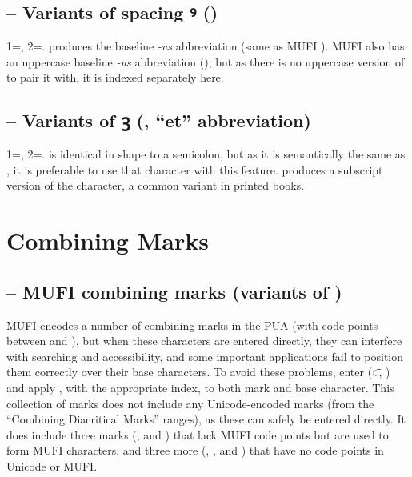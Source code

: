 \subsection{ -- Variants of spacing ꝰ ()}
1=, 2=.  produces the baseline \textit{{}-us} abbreviation (same as MUFI
). MUFI also has an uppercase baseline \textit{{}-us} abbreviation (), but as there is no uppercase version
of  to pair it with, it is indexed separately here.

\subsection{ -- Variants of ꝫ (, ``et'' abbreviation)}
1=, 2=. \textSourceText{[1]} is identical in shape to a
semicolon, but as it is semantically the same as , it is preferable to use that
character with this feature. \textSourceText{[2]} produces a subscript version of
the character, a common variant in printed books.

\section{Combining Marks}
\subsection{ -- MUFI combining marks (variants of )}
MUFI encodes a number of combining marks in the PUA (with code points between  and ), but when these characters
are entered directly, they can interfere with searching and accessibility, and some important applications fail to
position them correctly over their base characters. To avoid these problems, enter  (◌̄, ) and apply , with the appropriate index, to both mark and base character. This
collection of marks does not include any Unicode-encoded marks (from the ``Combining Diacritical Marks'' ranges), as
these can safely be entered directly. It does include three marks (,
\textSourceText{[31]} and \textSourceText{[32]}) that lack MUFI code points but are used to form MUFI
characters, and three more (\textSourceText{[2]}, \textSourceText{[33]},
and \textSourceText{[34]}) that have no code points in Unicode or MUFI.

